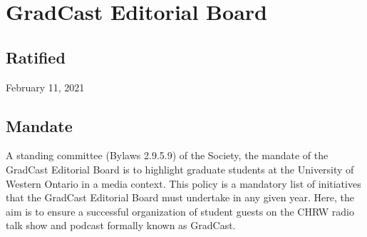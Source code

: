 \section{GradCast Editorial Board}

\subsection{Ratified}
February 11, 2021

\subsection{Mandate}
A standing committee (Bylaws 2.9.5.9) of the Society, the mandate of the GradCast Editorial Board is to highlight graduate students at the University of Western Ontario in a media context.
This policy is a mandatory list of initiatives that the GradCast Editorial Board must undertake in any given year. Here, the aim is to ensure a successful organization of student guests on the CHRW radio talk show and podcast formally known as GradCast.

